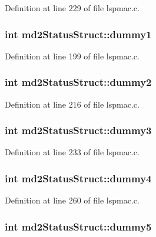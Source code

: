 Definition at line 229 of file lspmac.c.\hypertarget{structmd2StatusStruct_a3a2dff3e6a1a346806a655e8404e0f53}{
\subsubsection[{dummy1}]{\setlength{\rightskip}{0pt plus 5cm}int {\bf md2StatusStruct::dummy1}}}
\label{structmd2StatusStruct_a3a2dff3e6a1a346806a655e8404e0f53}


Definition at line 199 of file lspmac.c.\hypertarget{structmd2StatusStruct_a4df936acc498498baba111edb82597a1}{
\subsubsection[{dummy2}]{\setlength{\rightskip}{0pt plus 5cm}int {\bf md2StatusStruct::dummy2}}}
\label{structmd2StatusStruct_a4df936acc498498baba111edb82597a1}


Definition at line 216 of file lspmac.c.\hypertarget{structmd2StatusStruct_adb2dc5bdbf99def51018558201508009}{
\subsubsection[{dummy3}]{\setlength{\rightskip}{0pt plus 5cm}int {\bf md2StatusStruct::dummy3}}}
\label{structmd2StatusStruct_adb2dc5bdbf99def51018558201508009}


Definition at line 233 of file lspmac.c.\hypertarget{structmd2StatusStruct_adaa01db9cf77d95756bc3156fb702600}{
\subsubsection[{dummy4}]{\setlength{\rightskip}{0pt plus 5cm}int {\bf md2StatusStruct::dummy4}}}
\label{structmd2StatusStruct_adaa01db9cf77d95756bc3156fb702600}


Definition at line 260 of file lspmac.c.\hypertarget{structmd2StatusStruct_af4f8869f8954c6162cae80000c54694f}{
\subsubsection[{dummy5}]{\setlength{\rightskip}{0pt plus 5cm}int {\bf md2StatusStruct::dummy5}}}
\label{structmd2StatusStruct_af4f8869f8954c6162cae80000c54694f}


